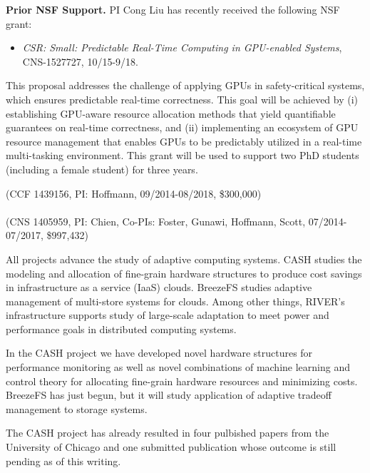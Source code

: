 \noindent \textbf{Prior NSF Support.} PI Cong Liu  has recently received the following NSF grant:

\begin{itemize}
\vspace{-2mm}
\item \textit{CSR: Small: Predictable Real-Time Computing in GPU-enabled Systems}, CNS-1527727, 10/15-9/18.
\vspace{-2mm}
\end{itemize}

This proposal addresses the challenge of applying GPUs in
safety-critical systems, which ensures predictable real-time
correctness. This goal will be achieved by (i) establishing GPU-aware
resource allocation methods that yield quantifiable guarantees on
real-time correctness, and (ii) implementing an ecosystem of GPU
resource management that enables GPUs to be predictably utilized in a
real-time multi-tasking environment. This grant will be used to
support two PhD students (including a female student) for three years.

\vspace{0.05cm}

 (CCF 1439156, PI: Hoffmann, 09/2014-08/2018, \$300,000)\\
 \\
 (CNS 1405959, PI:
Chien, Co-PIs: Foster, Gunawi, Hoffmann, Scott, 07/2014-07/2017,
\$997,432)

All projects advance the study of adaptive computing systems.  CASH
studies the modeling and allocation of fine-grain hardware structures
to produce cost savings in infrastructure as a service (IaaS) clouds.
BreezeFS studies adaptive management of multi-store systems for
clouds.  Among other things, RIVER's infrastructure supports study of
large-scale adaptation to meet power and performance goals in
distributed computing systems.  

 In the CASH project we have
developed novel hardware structures for performance monitoring as well
as novel combinations of machine learning and control theory for
allocating fine-grain hardware resources and minimizing costs.
BreezeFS has just begun, but it will study application of adaptive
tradeoff management to storage systems.

 The CASH project has already resulted
in four pulbished papers from the University of Chicago
\cite{kim-cpsna,POET,FSE2015,JouleGuard} and one submitted publication
whose outcome is still pending as of this writing.